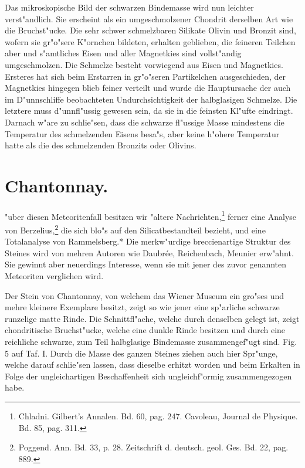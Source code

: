 \documentclass[a4paper, 11pt, oneside]{article}
\begin{document}
Das mikroskopische Bild der schwarzen Bindemasse wird nun leichter verst"andlich. Sie erscheint als ein umgeschmolzener Chondrit derselben Art wie die Bruchst"ucke. Die sehr schwer schmelzbaren Silikate Olivin und Bronzit sind, wofern sie gr"o"sere K"ornchen bildeten, erhalten geblieben, die feineren Teilchen aber und s"amtliches Eisen und aller Magnetkies sind vollst"andig umgeschmolzen. Die Schmelze besteht vorwiegend aus Eisen und Magnetkies. Ersteres hat sich beim Erstarren in gr"o"seren Partikelchen ausgeschieden, der Magnetkies hingegen blieb feiner verteilt und wurde die Hauptursache der auch im D"unnschliffe beobachteten Undurchsichtigkeit der halbglasigen Schmelze. Die letztere muss d"unnfl"ussig gewesen sein, da sie in die feinsten Kl"ufte eindringt. Darnach w"are zu schlie"sen, dass die schwarze fl"ussige Masse mindestens die Temperatur des schmelzenden Eisens besa"s, aber keine h"ohere Temperatur hatte als die des schmelzenden Bronzits oder Olivins.
\section{Chantonnay.}
\paragraph{}
"uber diesen Meteoritenfall besitzen wir "altere Nachrichten,\footnote{Chladni. Gilbert's Annalen. Bd. 60, pag. 247. Cavoleau, Journal de Physique. Bd. 85, pag. 311.} ferner eine Analyse von Berzelius,\footnote{Poggend. Ann. Bd. 33, p. 28. Zeitschrift d. deutsch. geol. Ges. Bd. 22, pag. 889.} die sich blo"s auf den Silicatbestandteil bezieht, und eine Totalanalyse von Rammelsberg.* Die merkw"urdige breccienartige Struktur des Steines wird von mehren Autoren wie Daubrée, Reichenbach, Meunier erw"ahnt. Sie gewinnt aber neuerdings Interesse, wenn sie mit jener des zuvor genannten Meteoriten verglichen wird.

Der Stein von Chantonnay, von welchem das Wiener Museum ein gro"ses und mehre kleinere Exemplare besitzt, zeigt so wie jener eine sp"arliche schwarze runzelige matte Rinde. Die Schnittfl"ache, welche durch denselben gelegt ist, zeigt chondritische Bruchst"ucke, welche eine dunkle Rinde besitzen und durch eine reichliche schwarze, zum Teil halbglasige Bindemasse zusammengef"ugt sind. Fig. 5 auf Taf. I. Durch die Masse des ganzen Steines ziehen auch hier Spr"unge, welche darauf schlie"sen lassen, dass dieselbe erhitzt worden und beim Erkalten in Folge der ungleichartigen Beschaffenheit sich ungleichf"ormig zusammengezogen habe.
\end{document}
